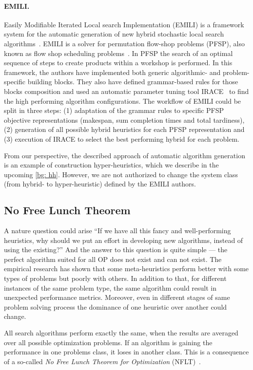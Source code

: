 \paragraph{EMILI.}
Easily Modifiable Iterated Local search Implementation (EMILI) is a framework system for the automatic generation of new hybrid stochastic local search algorithms~\cite{pagnozzi2019automatic}. EMILI is a solver for permutation flow-shop problems (PFSP), also known as flow shop scheduling problems~\cite{reza2005flowshop}. In PFSP the search of an optimal sequence of steps to create products within a workshop is performed.
In this framework, the authors have implemented both generic algorithmic- and problem-specific building blocks. They also have defined grammar-based rules for those blocks composition and used an automatic parameter tuning tool IRACE~\cite{lopez2016irace} to find the high performing algorithm configurations. The workflow of EMILI could be split in three steps: (1) adaptation of the grammar rules to specific PFSP objective representations (makespan, sum completion times and total tardiness), (2) generation of all possible hybrid heuristics for each PFSP representation and (3) execution of IRACE to select the best performing hybrid for each problem. 

From our perspective, the described approach of automatic algorithm generation is an example of construction hyper-heuristics, which we describe in the upcoming \cref{bg: hh}. However, we are not authorized to change the system class (from hybrid- to hyper-heuristic) defined by the EMILI authors.


\subsection{No Free Lunch Theorem}
A nature question could arise ``If we have all this fancy and well-performing heuristics, why should we put an effort in developing new algorithms, instead of using the existing?'' And the answer to this question is quite simple — the perfect algorithm suited for all OP does not exist and can not exist. 
The empirical research has shown that some meta-heuristics perform better with some types of problems but poorly with others. In addition to that, for different instances of the same problem type, the same algorithm could result in unexpected performance metrics. Moreover, even in different stages of same problem solving process the dominance of one heuristic over another could change. 

All search algorithms perform exactly the same, when the results are averaged over all possible optimization problems. If an algorithm is gaining the performance in one problems class, it loses in another class. This is a consequence of a so-called \emph{No Free Lunch Theorem for Optimization} (NFLT)~\cite{wolpert1997no}.

